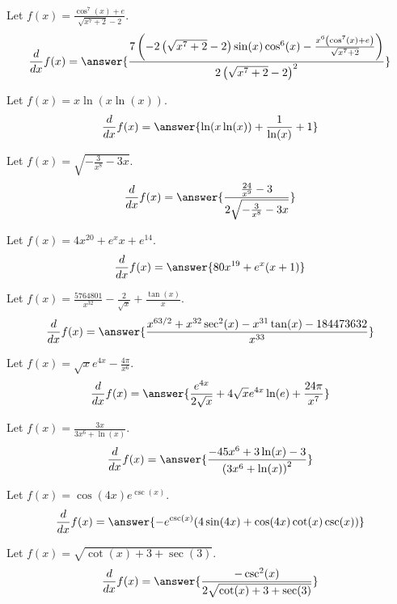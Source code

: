 \documentclass{ximera}
\begin{document}
\begin{shuffle}
\begin{exercise}
\begin{exercise}
Let $f(x)=\frac{\cos ^7(x)+e}{\sqrt{x^7+2}-2}$.
\[
\ddx f(x) = \answer{\frac{7 \left(-2 \left(\sqrt{x^7+2}-2\right) \sin (x) \cos ^6(x)-\frac{x^6 \left(\cos ^7(x)+e\right)}{\sqrt{x^7+2}}\right)}{2 \left(\sqrt{x^7+2}-2\right)^2}}
\]
\end{exercise}

\begin{exercise}
Let $f(x)=x \ln (x \ln (x))$.
\[
\ddx f(x) = \answer{\ln (x \ln (x))+\frac{1}{\ln (x)}+1}
\]
\end{exercise}

\begin{exercise}
Let $f(x)=\sqrt{-\frac{3}{x^8}-3 x}$.
\[
\ddx f(x) = \answer{\frac{\frac{24}{x^9}-3}{2 \sqrt{-\frac{3}{x^8}-3 x}}}
\]
\end{exercise}

\begin{exercise}
Let $f(x)=4 x^{20}+e^x x+e^{14}$.
\[
\ddx f(x) = \answer{80 x^{19}+e^x (x+1)}
\]
\end{exercise}

\begin{exercise}
Let $f(x)=\frac{5764801}{x^{32}}-\frac{2}{\sqrt{x}}+\frac{\tan (x)}{x}$.
\[
\ddx f(x) = \answer{\frac{x^{63/2}+x^{32} \sec ^2(x)-x^{31} \tan (x)-184473632}{x^{33}}}
\]
\end{exercise}

\begin{exercise}
Let $f(x)=\sqrt{x} e^{4 x}-\frac{4 \pi }{x^6}$.
\[
\ddx f(x) = \answer{\frac{e^{4 x}}{2 \sqrt{x}}+4 \sqrt{x} e^{4 x} \ln (e)+\frac{24 \pi }{x^7}}
\]
\end{exercise}

\begin{exercise}
Let $f(x)=\frac{3 x}{3 x^6+\ln (x)}$.
\[
\ddx f(x) = \answer{\frac{-45 x^6+3 \ln (x)-3}{\left(3 x^6+\ln (x)\right)^2}}
\]
\end{exercise}

\begin{exercise}
Let $f(x)=\cos (4 x) e^{\csc (x)}$.
\[
\ddx f(x) = \answer{-e^{\csc (x)} (4 \sin (4 x)+\cos (4 x) \cot (x) \csc (x))}
\]
\end{exercise}

\begin{exercise}
Let $f(x)=\sqrt{\cot (x)+3+\sec (3)}$.
\[
\ddx f(x) = \answer{\frac{-\csc^2(x)}{2 \sqrt{\cot (x)+3+\sec (3)}}}
\]
\end{exercise}


\end{exercise}
\end{shuffle}
\end{document}
